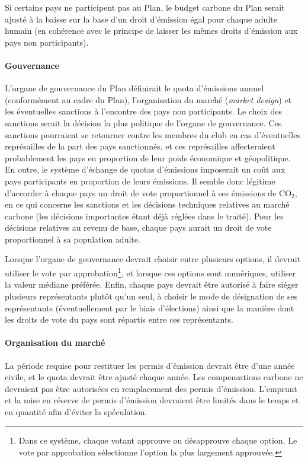 \documentclass[a5paper,french,openany]{memoir}
\begin{document}
Si certains pays ne participent pas au Plan, le budget carbone du Plan serait ajusté à la baisse sur la base d'un droit d'émission égal pour chaque adulte humain (en cohérence avec le principe de laisser les mêmes droits d'émission aux pays non participants).

\paragraph{Gouvernance} 
L'organe de gouvernance du Plan définirait le quota d'émissions annuel (conformément au cadre du Plan), l'organisation du marché (\textit{market design}) et les éventuelles sanctions à l'encontre des pays non participants. %
Le choix des sanctions serait la décision la plus politique de l'organe de gouvernance. Ces sanctions pourraient se retourner contre les membres du club en cas d'éventuelles représailles de la part des pays sanctionnés, et ces représailles affecteraient probablement les pays en proportion de leur poids économique et géopolitique. 
En outre, le système d'échange de quotas d'émissions imposerait un coût aux pays participants en proportion de leurs émissions. Il semble donc légitime d'accorder à chaque pays un droit de vote proportionnel à ses émissions de CO$_\text{2}$, en ce qui concerne les sanctions et les décisions techniques relatives au marché carbone (les décisions importantes étant déjà réglées dans le traité). 
Pour les décisions relatives au revenu de base, chaque pays aurait un droit de vote proportionnel à sa population adulte. 

Lorsque l'organe de gouvernance devrait choisir entre plusieurs options, il devrait utiliser le vote par approbation\footnote{Dans ce système, chaque votant approuve ou désapprouve chaque option. Le vote par approbation sélectionne l'option la plus largement approuvée.}, et lorsque ces options sont numériques, utiliser la valeur médiane préférée. Enfin, chaque pays devrait être autorisé à faire siéger plusieurs représentants plutôt qu'un seul, à choisir le mode de désignation de ses représentants (éventuellement par le biais d'élections) ainsi que la manière dont les droits de vote du pays sont répartis entre ces représentants. 


\paragraph{Organisation du marché} 
La période requise pour restituer les permis d'émission devrait être d'une année civile, et le quota devrait être ajusté chaque année. Les compensations carbone ne devraient pas être autorisées en remplacement des permis d'émission. L'emprunt et la mise en réserve de permis d'émission devraient être limités dans le temps et en quantité afin d'éviter la spéculation. %
\end{document}
